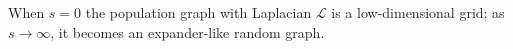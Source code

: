 \documentclass[xcolor=dvipsnames]{beamer}
\begin{document}
\begin{frame}
  \centering
  When $s = 0$ the population graph with Laplacian $\mathcal{L}$ is a
  low-dimensional grid; as $s \to \infty$, it becomes an expander-like 
  random graph.
\end{frame}
\end{document}

